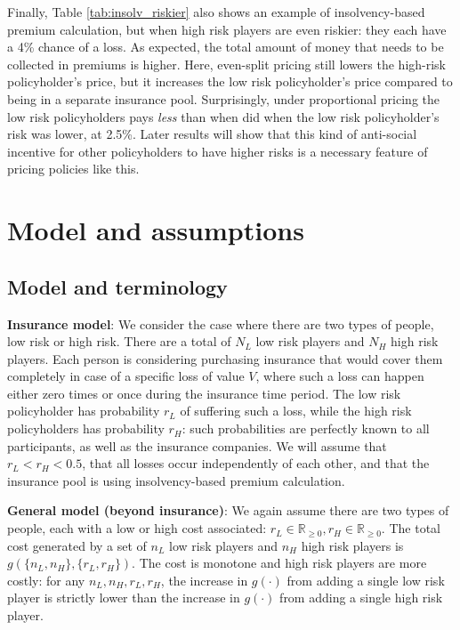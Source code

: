 \documentclass[sigconf]{acmart}
\newcommand{\NL}[0]{\ensuremath{N_L}}
\newcommand{\NH}[0]{\ensuremath{N_H}}
\newcommand{\nL}[0]{\ensuremath{n_L}}
\newcommand{\nH}[0]{\ensuremath{n_H}}
\newcommand{\rL}[0]{\ensuremath{r_L}}
\newcommand{\rH}[0]{\ensuremath{r_H}}
\newcommand{\V}[0]{\ensuremath{V}}
\newcommand{\cost}[0]{\ensuremath{g}}
\newcommand{\cd}[0]{\cdot}
\begin{document}
Finally, Table \ref{tab:insolv_riskier} also shows an example of insolvency-based premium calculation, but when high risk players are even riskier: they each have a 4\% chance of a loss. As expected, the total amount of money that needs to be collected in premiums is higher. Here, even-split pricing still lowers the high-risk policyholder's price, but it increases the low risk policyholder's price compared to being in a separate insurance pool. Surprisingly, under proportional pricing the low risk policyholders pays \emph{less} than when did when the low risk policyholder's risk was lower, at 2.5\%. Later results will show that this kind of anti-social incentive for other policyholders to have higher risks is a necessary feature of pricing policies like this. 

\section{Model and assumptions}
\subsection{Model and terminology}
\textbf{Insurance model}: We consider the case where there are two types of people, low risk or high risk. There are a total of $\NL$ low risk players and $\NH$ high risk players.  Each person is considering purchasing insurance that would cover them completely in case of a specific loss of value \V, where such a loss can happen either zero times or once during the insurance time period. The low risk policyholder has probability $\rL$ of suffering such a loss, while the high risk policyholders has probability $\rH$: such probabilities are perfectly known to all participants, as well as the insurance companies. We will assume that $\rL < \rH < 0.5$, that all losses occur independently of each other, and that the insurance pool is using insolvency-based premium calculation. 


\noindent \textbf{General model (beyond insurance)}: We again assume there are two types of people, each with a low or high cost associated: $\rL \in \mathbb{R}_{\geq0}, \rH \in \mathbb{R}_{\geq0}$. The total cost generated by a set of $\nL$ low risk players and $\nH$ high risk players is $\cost(\{\nL, \nH\}, \{\rL, \rH\})$. The cost is monotone and high risk players are more costly: for any $\nL, \nH, \rL, \rH$, the increase in $\cost(\cd)$ from adding a single low risk player is strictly lower than the increase in $\cost(\cd)$ from adding a single high risk player. 
\end{document}
